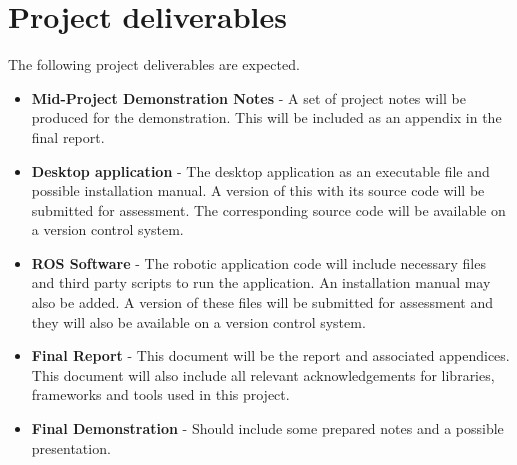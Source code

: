 \documentclass[11pt,fleqn,twoside]{article}
\begin{document}
\section{Project deliverables}
The following project deliverables are expected.

\begin{itemize}
    \item \textbf{Mid-Project Demonstration Notes} - A set of project notes will be produced 
                  for the demonstration. This will be included as an appendix in the final 
                  report.

    \item \textbf{Desktop application} - The desktop application as an executable file and 
                  possible installation manual. A version of this with its source code will be 
                  submitted for assessment. The corresponding source code will be available on a version 
                  control system.  

    \item \textbf{ROS Software} - The robotic application code will include necessary files and 
                  third party scripts to run the application. An installation manual may also be 
                  added. A version of these files will be submitted for assessment and they 
                  will also be available on a version control system.

    \item \textbf{Final Report} - This document will be the report and associated appendices. 
                  This document will also include all relevant acknowledgements for libraries, 
                  frameworks and tools used in this project.

    \item \textbf{Final Demonstration} - Should include some prepared notes and a possible 
                  presentation.
\end{itemize}

\nocite{*} 


%

\renewcommand{\refname}{Annotated Bibliography}  %
\end{document}
